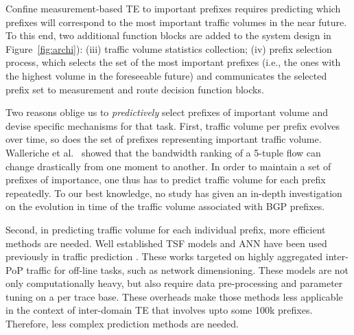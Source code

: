 Confine measurement-based TE to important prefixes requires predicting which prefixes will correspond to the most important traffic volumes in the near future.  
To this end, two additional function blocks are added to the system design in Figure~\ref{fig:archi}): (iii) traffic volume statistics collection; (iv) prefix selection process, which selects the set of the most important prefixes (i.e., the ones with the highest volume in the foreseeable future) and communicates the selected prefix set to measurement and route decision function blocks.

Two reasons oblige us to \textit{predictively} select prefixes of important volume and devise specific mechanisms for that task.
First, traffic volume per prefix evolves over time, so does the set of prefixes representing important traffic volume. 
Walleriche et al.~\cite{Wallerich2006} showed that the bandwidth ranking of a 5-tuple flow can change drastically from one moment to another.
In order to maintain a set of prefixes of importance, one thus has to predict traffic volume for each prefix repeatedly.
To our best knowledge, no study has given an in-depth investigation on the evolution in time of the traffic volume associated with BGP prefixes.

Second, in predicting traffic volume for each individual prefix, more efficient methods are needed.
Well established \acf{TSF} models and \acf{ANN} have been used previously in traffic prediction \cite{Papagiannaki2005, Cortez2006, Otoshi2013}.
These works targeted on highly aggregated inter-\acf{PoP} traffic for off-line tasks, such as network dimensioning.
These models are not only computationally heavy, but also require data pre-processing and parameter tuning on a per trace base.
These overheads make those methods less applicable in the context of inter-domain TE that involves upto some 100k prefixes. Therefore, less complex prediction methods are needed. 

